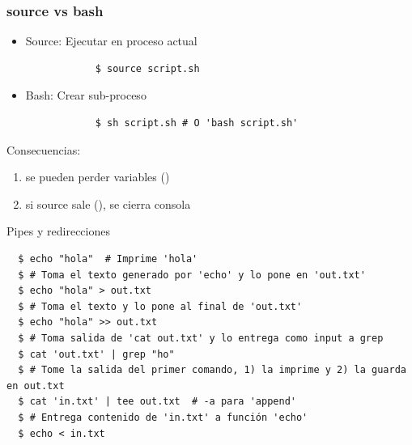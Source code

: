 \documentclass[14pt,aspectratio=169,xcolor=dvipsnames]{beamer}
\begin{document}
\begin{frame}[fragile]\frametitle{source vs bash}
    \begin{itemize}
        \item Source: Ejecutar en proceso actual
        \begin{verbatim}
            $ source script.sh
        \end{verbatim}
        \item Bash: Crear sub-proceso
        \begin{verbatim}
            $ sh script.sh # O 'bash script.sh'
        \end{verbatim}
    \end{itemize}

Consecuencias: 
    \begin{enumerate}
        \item se pueden perder variables ()
        \item  si source sale (), se cierra consola
    \end{enumerate}


\end{frame}
\begin{frame}[fragile]{Pipes y redirecciones}
    \begin{footnotesize}
    \begin{verbatim}
  $ echo "hola"  # Imprime 'hola'
  $ # Toma el texto generado por 'echo' y lo pone en 'out.txt'
  $ echo "hola" > out.txt 
  $ # Toma el texto y lo pone al final de 'out.txt'
  $ echo "hola" >> out.txt 
  $ # Toma salida de 'cat out.txt' y lo entrega como input a grep
  $ cat 'out.txt' | grep "ho"
  $ # Tome la salida del primer comando, 1) la imprime y 2) la guarda en out.txt
  $ cat 'in.txt' | tee out.txt  # -a para 'append'
  $ # Entrega contenido de 'in.txt' a función 'echo'
  $ echo < in.txt
    \end{verbatim} 
    \end{footnotesize}

\end{frame}
\end{document}
